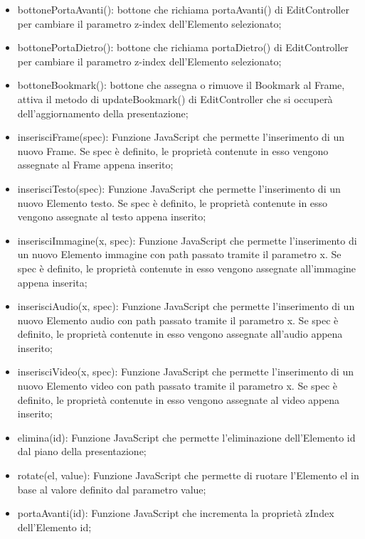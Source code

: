 {{\begin{itemize}
		\item bottonePortaAvanti(): bottone che richiama portaAvanti() di EditController per cambiare il parametro z-index dell'Elemento selezionato;
		\item bottonePortaDietro(): bottone che richiama portaDietro() di EditController per cambiare il parametro z-index dell'Elemento selezionato;
		\item bottoneBookmark(): bottone che assegna o rimuove il Bookmark al Frame, attiva il metodo di updateBookmark() di EditController che si occuperà dell'aggiornamento della presentazione;

		\item inserisciFrame(spec): Funzione JavaScript che permette l'inserimento di un nuovo Frame. Se spec è definito, le proprietà contenute in esso vengono assegnate al Frame appena inserito;
		\item inserisciTesto(spec): Funzione JavaScript che permette l'inserimento di un nuovo Elemento testo. Se spec è definito, le proprietà contenute in esso vengono assegnate al testo appena inserito;
		\item inserisciImmagine(x, spec): Funzione JavaScript che permette l'inserimento di un nuovo Elemento immagine con path passato tramite il parametro x. Se spec è definito, le proprietà contenute in esso vengono assegnate all'immagine appena inserita;
		\item inserisciAudio(x, spec): Funzione JavaScript che permette l'inserimento di un nuovo Elemento audio con path passato tramite il parametro x. Se spec è definito, le proprietà contenute in esso vengono assegnate all'audio appena inserito;
		\item inserisciVideo(x, spec): Funzione JavaScript che permette l'inserimento di un nuovo Elemento video con path passato tramite il parametro x. Se spec è definito, le proprietà contenute in esso vengono assegnate al video appena inserito;
		\item elimina(id): Funzione JavaScript che permette l'eliminazione dell'Elemento id dal piano della presentazione;
		\item rotate(el, value): Funzione JavaScript che permette di ruotare l'Elemento el in base al valore definito dal parametro value;
		\item portaAvanti(id): Funzione JavaScript che incrementa la proprietà zIndex dell'Elemento id;

\end{itemize}}}
